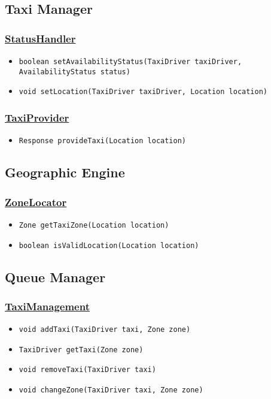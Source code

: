 \subsection{Taxi Manager}
\subsubsection{\underline{StatusHandler}}
\begin{itemize}
	\item \texttt{boolean setAvailabilityStatus(TaxiDriver taxiDriver, AvailabilityStatus status)}
	\item \texttt{void setLocation(TaxiDriver taxiDriver, Location location)}
\end{itemize}
\subsubsection{\underline{TaxiProvider}}
\begin{itemize}
	\item \texttt{Response provideTaxi(Location location)}
\end{itemize}
\subsection{Geographic Engine}
\subsubsection{\underline{ZoneLocator}}
\begin{itemize}
	\item \texttt{Zone getTaxiZone(Location location)}
	\item \texttt{boolean isValidLocation(Location location)}
\end{itemize}
\subsection{Queue Manager}
\subsubsection{\underline{TaxiManagement}}
\begin{itemize}
	\item \texttt{void addTaxi(TaxiDriver taxi, Zone zone)}
	\item \texttt{TaxiDriver getTaxi(Zone zone)}
	\item \texttt{void removeTaxi(TaxiDriver taxi)}
	\item \texttt{void changeZone(TaxiDriver taxi, Zone zone)}
\end{itemize}